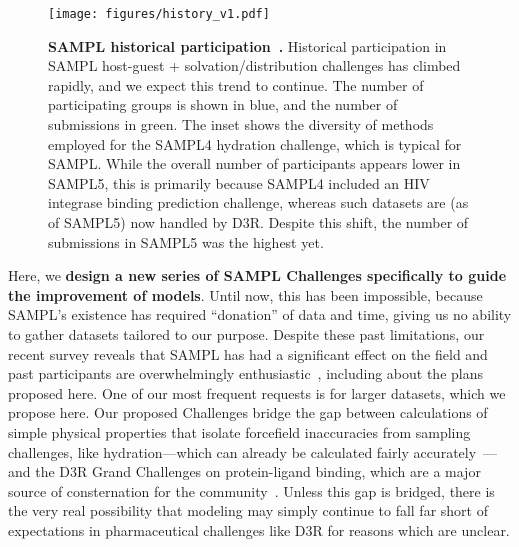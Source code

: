 \documentclass[11pt]{article}
\begin{document}
\begin{figure}
\vspace{-0.15in}
\begin{centering}
\texttt{[image: figures/history\_v1.pdf]}

\end{centering}
\footnotesize
\caption{\label{figure:sampl_history}  
\textbf{SAMPL historical participation~\cite{mobley_blind_2014-1}.} 
Historical participation in SAMPL host-guest + solvation/distribution challenges has climbed rapidly, and we expect this trend to continue. The number of participating groups is shown in blue, and the number of submissions in green. The inset shows the diversity of methods employed for the SAMPL4 hydration challenge, which is typical for SAMPL. 
While the overall number of participants appears lower in SAMPL5, this is primarily because SAMPL4 included an HIV integrase binding prediction challenge, whereas such datasets are (as of SAMPL5) now handled by D3R.
Despite this shift, the number of submissions in SAMPL5 was the highest yet.
}
\end{figure}

Here, we \textbf{design a new series of SAMPL Challenges specifically to guide the improvement of models}.
Until now, this has been impossible, because SAMPL's existence has required ``donation'' of data and time, giving us no ability to gather datasets tailored to our purpose. 
Despite these past limitations, our recent survey reveals that SAMPL has had a significant effect on the field and past participants are overwhelmingly enthusiastic~\cite{Mobley:2017:eScholarship}, including about the plans proposed here. 
One of our most frequent requests is for larger datasets, which we propose here. 
Our proposed Challenges bridge the gap between calculations of simple physical properties that isolate forcefield inaccuracies from sampling challenges, like hydration---which can already be calculated fairly accurately~\cite{mobley_blind_2014-1}---and the D3R Grand Challenges on protein-ligand binding, which are a major source of consternation for the community~\cite{ignjatovic_binding-affinity_2016, deng_large_2016, sunseri_d3r_2016, Gathiaka:2016:JComputAidedMolDes}.
Unless this gap is bridged, there is the very real possibility that modeling may simply continue to fall far short of expectations in pharmaceutical challenges like D3R for reasons which are unclear.
\end{document}
